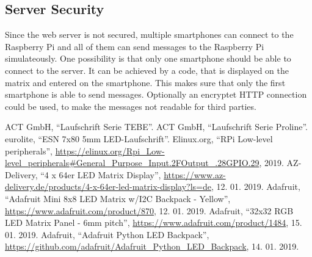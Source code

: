 \documentclass[conference]{IEEEtran}
\begin{document}
\subsection{Server Security}
Since the web server is not secured, multiple smartphones can connect to the Raspberry Pi and all of them can send messages to the Raspberry Pi simulateously. One possibility is that only one smartphone should be able to connect to the server. It can be achieved by a code, that is displayed on the matrix and entered on the smartphone. This makes sure that only the first smartphone is able to send messages. Optionally an encryptet HTTP connection could be used, to make the messages not readable for third parties.


\begin{thebibliography}{00}
  ACT GmbH,
  ``Laufschrift Serie TEBE''.
  ACT GmbH,
  ``Laufschrift Serie Proline''.
  eurolite,
  ``ESN 7x80 5mm LED-Laufschrift''.
  Elinux.org,
  ``RPi Low-level peripherals'',
  \url{https://elinux.org/Rpi_Low-level_peripherals#General_Purpose_Input.2FOutput_.28GPIO.29},
  2019.
  AZ-Delivery,
  ``4 x 64er LED Matrix Display'',
  \url{https://www.az-delivery.de/products/4-x-64er-led-matrix-display?ls=de},
  12. 01. 2019.
  Adafruit,
  ``Adafruit Mini 8x8 LED Matrix w/I2C Backpack - Yellow'',
  \url{https://www.adafruit.com/product/870},
  12. 01. 2019.
  Adafruit,
  ``32x32 RGB LED Matrix Panel - 6mm pitch'',
  \url{https://www.adafruit.com/product/1484},
  15. 01. 2019.
  Adafruit,
  ``Adafruit Python LED Backpack'',
  \url{https://github.com/adafruit/Adafruit_Python_LED_Backpack},
  14. 01. 2019.
\end{thebibliography}
\end{document}
